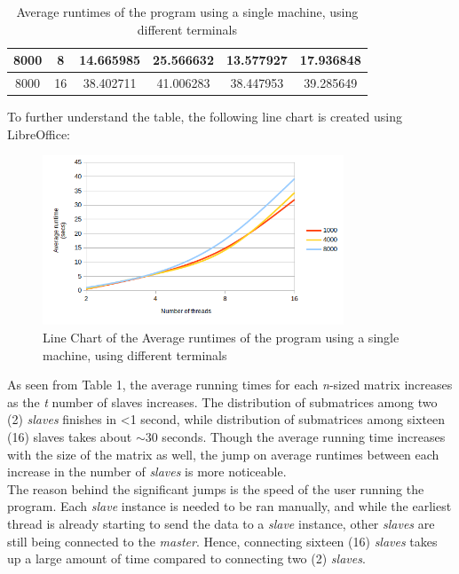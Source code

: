 \documentclass{article}
\begin{document}
\begin{table}[H]
{\begin{tabular}{|c|c|ccc|c|}
    8000                                                                                   & 8                                                                                        & \multicolumn{1}{c|}{14.665985}      & \multicolumn{1}{c|}{25.566632}      & 13.577927      & 17.936848                                                                                         \\ \hline
    8000                                                                                   & 16                                                                                       & \multicolumn{1}{c|}{38.402711}      & \multicolumn{1}{c|}{41.006283}      & 38.447953      & 39.285649                                                                                         \\ \hline
    \end{tabular}}
    \caption{\label{table}Average runtimes of the program using a single machine, using different terminals}
    \end{table}          
    
\indent To further understand the table, the following line chart is created using LibreOffice:
\begin{figure}[H]
    \includegraphics[width=0.8\textwidth]{chart01.png}
    \centering
    \caption{Line Chart of the Average runtimes of the program using a single machine, using different terminals}
    \end{figure}


\indent As seen from Table 1, the average running times for each \emph{n}-sized matrix increases as the \emph{t} number of slaves increases. The distribution of submatrices among two (2) \emph{slaves} finishes in \textless1 second, while distribution of submatrices among sixteen (16) slaves takes about \(\sim\)30 seconds. Though the average running time increases with the size of the matrix as well, the jump on average runtimes between each increase in the number of \emph{slaves} is more noticeable. \\
\indent The reason behind the significant jumps is the speed of the user running the program. Each \emph{slave} instance is needed to be ran manually, and while the earliest thread is already starting to send the data to a \emph{slave} instance, other \emph{slaves} are still being connected to the \emph{master}. Hence, connecting sixteen (16) \emph{slaves} takes up a large amount of time compared to connecting two (2) \emph{slaves}. \\
\end{document}
